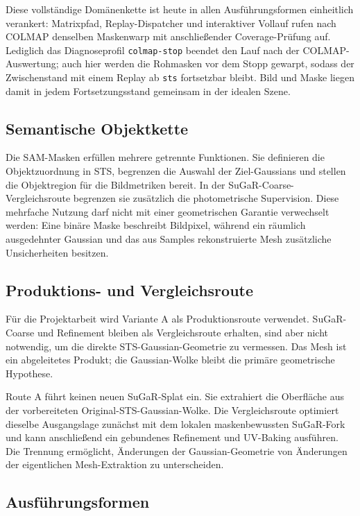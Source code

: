 Diese vollständige Domänenkette ist heute in allen Ausführungsformen
einheitlich verankert: Matrixpfad, Replay-Dispatcher und interaktiver
Vollauf rufen nach COLMAP denselben Maskenwarp mit anschließender
Coverage-Prüfung auf. Lediglich das Diagnoseprofil \texttt{colmap-stop}
beendet den Lauf nach der COLMAP-Auswertung; auch hier werden die Rohmasken
vor dem Stopp gewarpt, sodass der Zwischenstand mit einem Replay ab
\texttt{sts} fortsetzbar bleibt. Bild und Maske liegen damit in jedem
Fortsetzungsstand gemeinsam in der idealen Szene.

\subsection{Semantische Objektkette}

Die SAM-Masken erfüllen mehrere getrennte Funktionen. Sie definieren die
Objektzuordnung in STS, begrenzen die Auswahl der Ziel-Gaussians und stellen die
Objektregion für die Bildmetriken bereit. In der SuGaR-Coarse-Vergleichsroute
begrenzen sie zusätzlich die photometrische Supervision. Diese mehrfache
Nutzung darf nicht mit einer geometrischen Garantie verwechselt werden: Eine
binäre Maske beschreibt Bildpixel, während ein räumlich ausgedehnter Gaussian
und das aus Samples rekonstruierte Mesh zusätzliche Unsicherheiten besitzen.

\subsection{Produktions- und Vergleichsroute}

Für die Projektarbeit wird Variante A als Produktionsroute verwendet. SuGaR-
Coarse und Refinement bleiben als Vergleichsroute erhalten, sind aber nicht
notwendig, um die direkte STS-Gaussian-Geometrie zu vermessen. Das Mesh ist ein
abgeleitetes Produkt; die Gaussian-Wolke bleibt die primäre geometrische
Hypothese.

Route A führt keinen neuen SuGaR-Splat ein. Sie extrahiert die Oberfläche aus
der vorbereiteten Original-STS-Gaussian-Wolke. Die Vergleichsroute optimiert
dieselbe Ausgangslage zunächst mit dem lokalen maskenbewussten SuGaR-Fork und
kann anschließend ein gebundenes Refinement und UV-Baking ausführen. Die
Trennung ermöglicht, Änderungen der Gaussian-Geometrie von Änderungen der
eigentlichen Mesh-Extraktion zu unterscheiden.

\subsection{Ausführungsformen}

